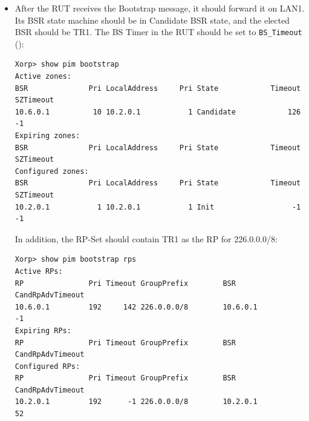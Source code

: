 \documentclass[11pt]{report}
\begin{document}
\begin{itemize}
  \item After the RUT receives the Bootstrap message, it should forward
        it on LAN1. Its BSR state machine
        should be in Candidate BSR state, and the elected BSR should be TR1.
        The BS Timer in the RUT should be set to \verb=BS_Timeout=
        ({\PimsmBSTimeout}):

\begin{verbatim}
Xorp> show pim bootstrap 
Active zones:
BSR              Pri LocalAddress     Pri State            Timeout SZTimeout
10.6.0.1          10 10.2.0.1           1 Candidate            126        -1
Expiring zones:
BSR              Pri LocalAddress     Pri State            Timeout SZTimeout
Configured zones:
BSR              Pri LocalAddress     Pri State            Timeout SZTimeout
10.2.0.1           1 10.2.0.1           1 Init                  -1        -1
\end{verbatim}

  In addition, the RP-Set should contain TR1 as the RP for 226.0.0.0/8:

\begin{verbatim}
Xorp> show pim bootstrap rps 
Active RPs:
RP               Pri Timeout GroupPrefix        BSR         CandRpAdvTimeout
10.6.0.1         192     142 226.0.0.0/8        10.6.0.1                  -1
Expiring RPs:
RP               Pri Timeout GroupPrefix        BSR         CandRpAdvTimeout
Configured RPs:
RP               Pri Timeout GroupPrefix        BSR         CandRpAdvTimeout
10.2.0.1         192      -1 226.0.0.0/8        10.2.0.1                  52
\end{verbatim}

\end{itemize}

\end{document}
